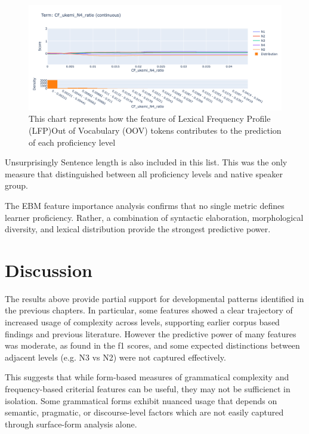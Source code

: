 \begin{figure}[h!]
    \centering
    \includegraphics[scale=.4]{img/EBM/EBMukemi}
    \caption[Contribution of ratio of passive form (受身形、ukemi)]{This chart represents how the feature of Lexical Frequency Profile (LFP)Out of Vocabulary (OOV) tokens contributes to the prediction of each proficiency level}
    \label{fig:EBMukemi}
\end{figure}


Unsurprisingly Sentence length is also included in this list. This was the only measure that distinguished between
all proficiency levels and native speaker group.

The EBM feature importance analysis confirms that no single metric defines learner proficiency. Rather, a
combination of syntactic elaboration, morphological diversity, and lexical distribution provide the strongest
predictive power.

\section{Discussion}

The results above provide partial support for developmental patterns identified in the previous chapters. In
particular, some features showed a clear trajectory of increased usage of complexity across levels, supporting
earlier corpus based findings and previous literature. However the predictive power of many features was moderate,
as found in the f1 scores, and some expected distinctions between adjacent levels (e.g. N3 vs N2) were not captured
effectively.

This suggests that while form-based measures of grammatical complexity and frequency-based criterial features can be
useful, they may not be sufficienct in isolation. Some grammatical forms exhibit nuanced usage that depends on
semantic, pragmatic, or discourse-level factors which are not easily captured through surface-form
analysis alone.


